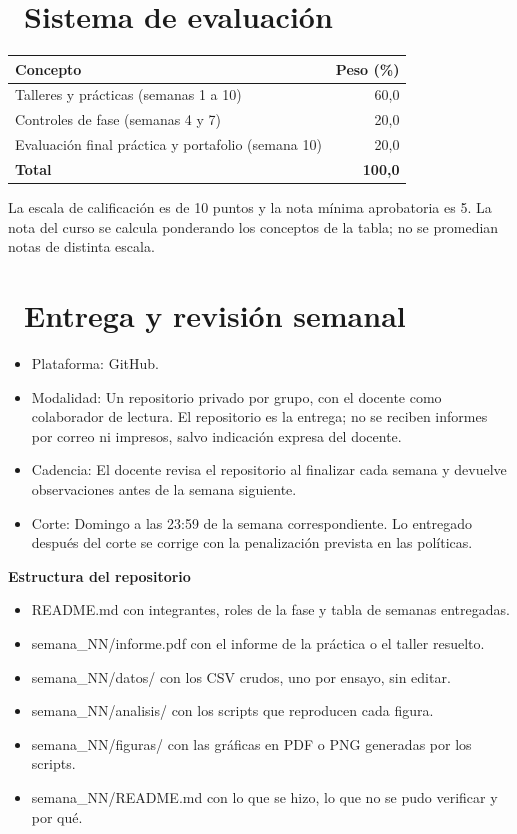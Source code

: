 \documentclass[11pt,a4paper]{article}
\newcommand{\iconotexto}[2]{\textcolor{cyanNeon}{\faIcon{#1}}~#2}
\begin{document}
\section{\iconotexto{clipboard-check}{Sistema de evaluación}}

\begin{tabularx}{\linewidth}{@{}X r@{}}
\toprule
Concepto & Peso (\%)\\
\midrule
Talleres y prácticas (semanas 1 a 10) & 60,0 \\
Controles de fase (semanas 4 y 7) & 20,0 \\
Evaluación final práctica y portafolio (semana 10) & 20,0 \\
\midrule
\textbf{Total} & \textbf{100,0}\\
\bottomrule
\end{tabularx}

\begin{cajaRecuerda}La escala de calificación es de 10 puntos y la nota mínima aprobatoria es 5. La nota del curso se calcula ponderando los conceptos de la tabla; no se promedian notas de distinta escala.
\end{cajaRecuerda}

\section{\iconotexto{code-branch}{Entrega y revisión semanal}}

\begin{itemize}[leftmargin=1.4em,itemsep=2pt,topsep=3pt]
  \item Plataforma: GitHub.
  \item Modalidad: Un repositorio privado por grupo, con el docente como colaborador de lectura. El repositorio es la entrega; no se reciben informes por correo ni impresos, salvo indicación expresa del docente.
  \item Cadencia: El docente revisa el repositorio al finalizar cada semana y devuelve observaciones antes de la semana siguiente.
  \item Corte: Domingo a las 23:59 de la semana correspondiente. Lo entregado después del corte se corrige con la penalización prevista en las políticas.
\end{itemize}

\textbf{Estructura del repositorio}

\begin{itemize}[leftmargin=1.4em,itemsep=2pt,topsep=3pt]
  \item README.md con integrantes, roles de la fase y tabla de semanas entregadas.
  \item semana\_NN/informe.pdf con el informe de la práctica o el taller resuelto.
  \item semana\_NN/datos/ con los CSV crudos, uno por ensayo, sin editar.
  \item semana\_NN/analisis/ con los scripts que reproducen cada figura.
  \item semana\_NN/figuras/ con las gráficas en PDF o PNG generadas por los scripts.
  \item semana\_NN/README.md con lo que se hizo, lo que no se pudo verificar y por qué.
\end{itemize}
\end{document}
